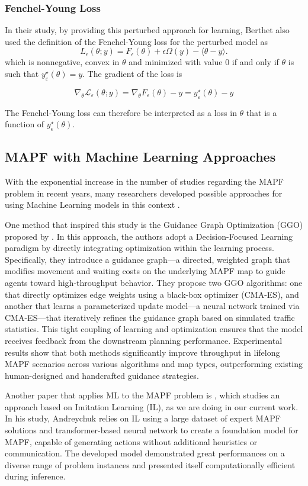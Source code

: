 \subsubsection{Fenchel-Young Loss}

In their study, by providing this perturbed approach for learning, Berthet also used the definition of the Fenchel-Young loss \cite{blondelLearningFenchelYoungLosses} for the perturbed model as
\[
L_\epsilon (\theta;y) = F_\epsilon (\theta) + \epsilon \Omega(y) - \langle \theta - y \tag{8}\rangle.
\]
which is nonnegative, convex in \(\theta\) and minimized with value 0 if and only if \(\theta\) is such that \(y^\star_\varepsilon(\theta) = y\). The gradient of the loss is

\[
\nabla_\theta \mathcal{L}_\varepsilon(\theta; y) = \nabla_\theta F_\varepsilon(\theta) - y = y^\star_\varepsilon(\theta) - y \tag{9}
\]

The Fenchel-Young loss can therefore be interpreted as a loss in $\theta$ that is a function of \(y^\star_\epsilon(\theta)\).


\subsection{MAPF with Machine Learning Approaches}

With the exponential increase in the number of studies regarding the MAPF problem in recent years, many researchers developed possible approaches for using Machine Learning models in this context \cite{wangWherePathsCollide2025}.

One method that inspired this study is the Guidance Graph Optimization (GGO) proposed by \cite{zhangGuidanceGraphOptimization2024}. In this approach, the authors adopt a Decision-Focused Learning paradigm by directly integrating optimization within the learning process. Specifically, they introduce a guidance graph—a directed, weighted graph that modifies movement and waiting costs on the underlying MAPF map to guide agents toward high-throughput behavior. They propose two GGO algorithms: one that directly optimizes edge weights using a black-box optimizer (CMA-ES), and another that learns a parameterized update model—a neural network trained via CMA-ES—that iteratively refines the guidance graph based on simulated traffic statistics. This tight coupling of learning and optimization ensures that the model receives feedback from the downstream planning performance. Experimental results show that both methods significantly improve throughput in lifelong MAPF scenarios across various algorithms and map types, outperforming existing human-designed and handcrafted guidance strategies.

Another paper that applies ML to the MAPF problem is \cite{andreychukMAPFGPTImitationLearning2025}, which studies an approach based on Imitation Learning (IL), as we are doing in our current work. In his study, Andreychuk relies on IL using a large dataset
of expert MAPF solutions and transformer-based neural network to create a foundation model for MAPF, capable of generating actions without additional heuristics or communication. The developed model demonstrated great performances on a diverse range of problem instances and presented itself computationally efficient during inference.